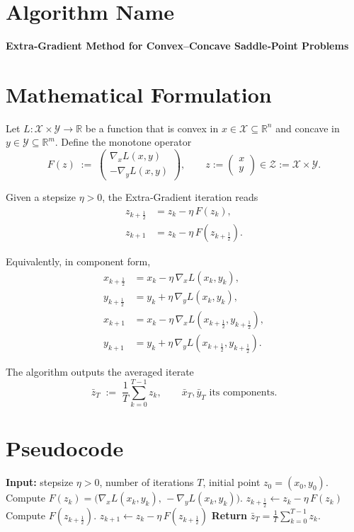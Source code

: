 \documentclass{article}
\newcommand{\R}{\mathbb{R}}
\begin{document}
\section*{Algorithm Name}
\textbf{Extra‑Gradient Method for Convex–Concave Saddle‑Point Problems}

\section*{Mathematical Formulation}
Let $L:\mathcal{X}\times\mathcal{Y}\rightarrow\R$ be a function that is convex in $x\in\mathcal{X}\subseteq\R^{n}$ and concave in $y\in\mathcal{Y}\subseteq\R^{m}$.  
Define the monotone operator
\[
F(z)\;:=\;
\begin{pmatrix}
\nabla_{x}L(x,y)\\[2mm]
-\nabla_{y}L(x,y)
\end{pmatrix},
\qquad 
z:=\begin{pmatrix}x\\y\end{pmatrix}\in\mathcal{Z}:=\mathcal{X}\times\mathcal{Y}.
\]

Given a stepsize $\eta>0$, the Extra‑Gradient iteration reads
\[
\boxed{
\begin{aligned}
z_{k+\frac12} &= z_{k}-\eta\,F(z_{k}) ,\\[1mm]
z_{k+1}       &= z_{k}-\eta\,F\!\left(z_{k+\frac12}\right) .
\end{aligned}}
\tag{EG}
\]

Equivalently, in component form,
\[
\begin{aligned}
x_{k+\frac12}&=x_{k}-\eta\,\nabla_{x}L(x_{k},y_{k}),\\
y_{k+\frac12}&=y_{k}+\eta\,\nabla_{y}L(x_{k},y_{k}),\\[1mm]
x_{k+1}&=x_{k}-\eta\,\nabla_{x}L\!\left(x_{k+\frac12},y_{k+\frac12}\right),\\
y_{k+1}&=y_{k}+\eta\,\nabla_{y}L\!\left(x_{k+\frac12},y_{k+\frac12}\right).
\end{aligned}
\tag{1}
\]

The algorithm outputs the averaged iterate
\[
\bar z_{T}\;:=\;\frac{1}{T}\sum_{k=0}^{T-1}z_{k},
\qquad 
\bar x_{T},\bar y_{T}\text{ its components.}
\]

\section*{Pseudocode}
\begin{algorithm}[H]
\caption{Extra‑Gradient for $\displaystyle\min_{x\in\mathcal{X}}\max_{y\in\mathcal{Y}}L(x,y)$}
\begin{algorithmic}[1]
\STATE \textbf{Input:} stepsize $\eta>0$, number of iterations $T$, initial point $z_{0}=(x_{0},y_{0})$.
    \STATE Compute $F(z_{k})=\big(\nabla_{x}L(x_{k},y_{k}),\,-\nabla_{y}L(x_{k},y_{k})\big)$.
    \STATE $z_{k+\frac12}\gets z_{k}-\eta\,F(z_{k})$   \hfill{}
    \STATE Compute $F(z_{k+\frac12})$.
    \STATE $z_{k+1}\gets z_{k}-\eta\,F(z_{k+\frac12})$ \hfill{}
\ENDFOR
\STATE \textbf{Return} $\displaystyle\bar z_{T}=\frac1T\sum_{k=0}^{T-1}z_{k}$.
\end{algorithmic}
\end{algorithm}
\end{document}
